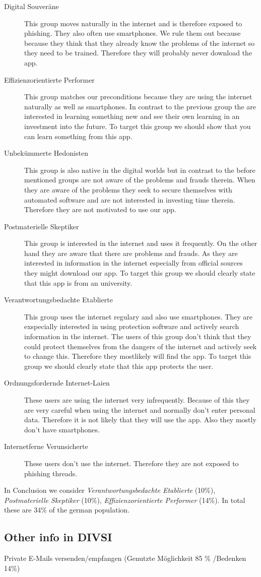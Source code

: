 \begin{description}
\item[Digital Souveräne] This group moves naturally in the internet and is therefore exposed to phishing. They also often use smartphones. We rule them out because because they think that they already know the problems of the internet so they need to be trained. Therefore they will probably never download the app.
\item[Effizienzorientierte Performer] This group matches our preconditions because they are using the internet naturally as well as smartphones. In contrast to the previous group the are interested in learning something new and see their own learning in an investment into the future. To target this group we should show that you can learn something from this app.
\item[Unbekümmerte Hedonisten] This group is also native in the digital worlds but in contrast to the before mentioned groups are not aware of the problems and frauds therein. When they are aware of the problems they seek to secure themselves with automated software and are not interested in investing time therein. Therefore they are not motivated to use our app.
\item[Postmaterielle Skeptiker] This group is interested in the internet and uses it frequently. On the other hand they are aware that there are problems and frauds. As they are interested in information in the internet especially from official sources they might download our app. To target this group we should clearly state that this app is from an university.
\item[Verantwortungsbedachte Etablierte] This group uses the internet regulary and also use smartphones. They are exspecially interested in using protection software and actively search information in the internet. The users of this group don't think that they could protect themselves from the dangers of the internet and actively seek to change this. Therefore they mostlikely will find the app. To target this group we should clearly state that this app protects the user.
\item[Ordnungsfordernde Internet-Laien] These users are using the internet very infrequently. Because of this they are very careful when using the internet and normally don't enter personal data. Therefore it is not likely that they will use the app. Also they mostly don't have smartphones.
\item[Internetferne Verunsicherte] These users don't use the internet. Therefore they are not exposed to phishing threads.
\end{description}

In Conclusion we consider \textit{Verantwortungsbedachte Etablierte} (10\%),  \textit{Postmaterielle Skeptiker} (10\%),  \textit{Effizienzorientierte Performer} (14\%). In total these are 34\% of the german population.

\subsection{Other info in DIVSI}
Private E-Mails versenden/empfangen (Genutzte Möglichkeit 85 \% \slash Bedenken 14\%)